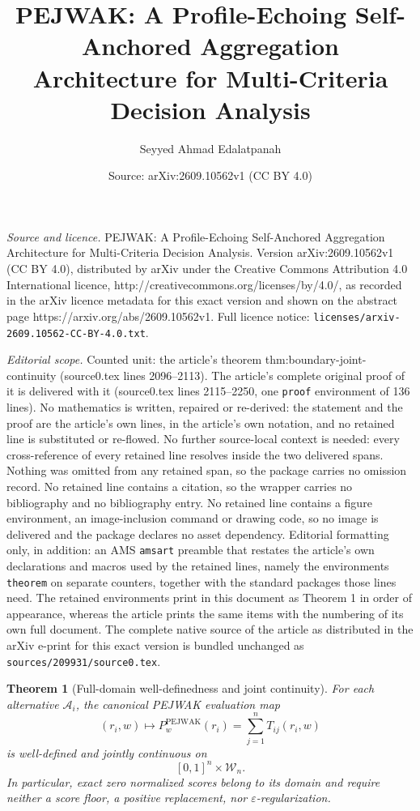 \documentclass[10pt,a4paper]{amsart}
\title{PEJWAK: A Profile-Echoing Self-Anchored Aggregation Architecture for Multi-Criteria Decision Analysis}
\author{Seyyed Ahmad Edalatpanah}
\date{Source: arXiv:2609.10562v1 (CC BY 4.0)}
\newtheorem{theorem}{Theorem}
\begin{document}
\maketitle

\noindent\emph{Source and licence.} PEJWAK: A Profile-Echoing Self-Anchored Aggregation Architecture for Multi-Criteria Decision Analysis. Version arXiv:2609.10562v1 (CC BY 4.0), distributed by arXiv under the Creative Commons Attribution 4.0 International licence, http://creativecommons.org/licenses/by/4.0/, as recorded in the arXiv licence metadata for this exact version and shown on the abstract page https://arxiv.org/abs/2609.10562v1. Full licence notice: \texttt{licenses/arxiv-2609.10562-CC-BY-4.0.txt}.\par\smallskip

\noindent\textit{Editorial scope.} Counted unit: the article's theorem thm:boundary-joint-continuity (source0.tex lines 2096--2113). The article's complete original proof of it is delivered with it (source0.tex lines 2115--2250, one \texttt{proof} environment of 136 lines). No mathematics is written, repaired or re-derived: the statement and the proof are the article's own lines, in the article's own notation, and no retained line is substituted or re-flowed.  No further source-local context is needed: every cross-reference of every retained line resolves inside the two delivered spans.  Nothing was omitted from any retained span, so the package carries no omission record.  No retained line contains a citation, so the wrapper carries no bibliography and no bibliography entry.  No retained line contains a figure environment, an image-inclusion command or drawing code, so no image is delivered and the package declares no asset dependency.  Editorial formatting only, in addition: an AMS \texttt{amsart} preamble that restates the article's own declarations and macros used by the retained lines, namely the environments \texttt{theorem} on separate counters, together with the standard packages those lines need.  The retained environments print in this document as Theorem 1 in order of appearance, whereas the article prints the same items with the numbering of its own full document.  The complete native source of the article as distributed in the arXiv e-print for this exact version is bundled unchanged as \texttt{sources/209931/source0.tex}.
\begin{theorem}[Full-domain well-definedness and joint continuity]
\label{thm:boundary-joint-continuity}
For each alternative \(\mathcal A_i\), the canonical PEJWAK evaluation map
\[
(r_i,w)
\longmapsto
P_w^{\mathrm{PEJWAK}}(r_i)
=
\sum_{j=1}^{n}T_{ij}(r_i,w)
\]
is well-defined and jointly continuous on
\[
[0,1]^n\times\mathcal W_n.
\]
In particular, exact zero normalized scores belong to its domain and
require neither a score floor, a positive replacement, nor
\(\varepsilon\)-regularization.
\end{theorem}
\end{document}
